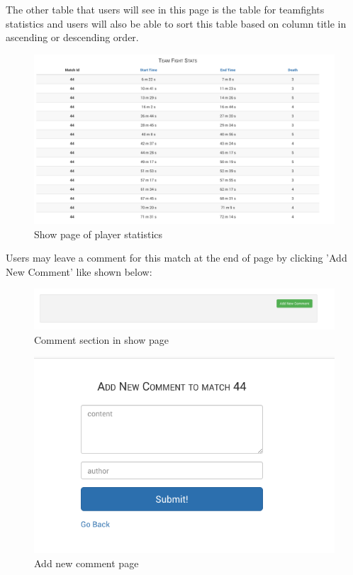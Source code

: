 \documentclass[a4paper]{article}
\begin{document}
\noindent The other table that users will see in this page is the table for teamfights statistics and users will also be able to sort this table based on column title in ascending or descending order.\par
\begin{figure}[H]
\centering
\includegraphics[width=1.0\textwidth]{teeamfight.png}
\caption{\label{fig:fig8}Show page of player statistics}
\end{figure}
\noindent Users may leave a comment for this match at the end of page by clicking 'Add New Comment' like shown below: 
\begin{figure}[H]
\centering
\includegraphics[width=1.0\textwidth]{add_comment2.png}
\caption{\label{fig:fig9}Comment section in show page}
\end{figure}

\begin{figure}[H]
\centering
\includegraphics[width=1.0\textwidth]{comment_add.png}
\caption{\label{fig:fig10}Add new comment page}
\end{figure}
\end{document}
